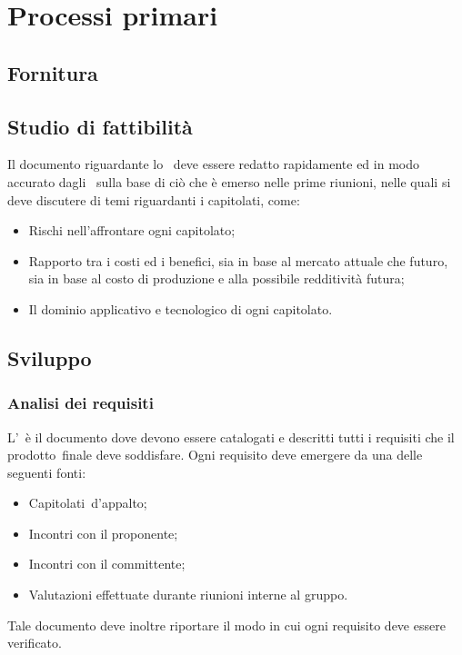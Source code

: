 \documentclass[../NormeProgetto.tex]{subfiles}
\begin{document}
\section{Processi primari}
	\subsection{Fornitura}
		\subsection{Studio di fattibilità}
			Il documento riguardante lo \studiodifattibilita\ deve essere redatto rapidamente ed in modo accurato dagli \analisti\ sulla base di ciò che è emerso nelle prime riunioni, nelle quali si deve discutere di temi riguardanti i capitolati, come:
			\begin{itemize}
				\item Rischi nell'affrontare ogni capitolato\g;
				\item Rapporto tra i costi ed i benefici, sia in base al mercato attuale che futuro, sia in base al costo di produzione e alla possibile redditività futura;
				\item Il dominio applicativo e tecnologico di ogni capitolato\g.
			\end{itemize}
	\subsection{Sviluppo}
		\subsubsection{Analisi dei requisiti}
			L'\analisideirequisiti\ è il documento dove devono essere catalogati e descritti tutti i requisiti che il prodotto\g\ finale deve soddisfare. Ogni requisito deve emergere da una delle seguenti fonti:
			\begin{itemize}
				\item Capitolati\g\ d'appalto;
				\item Incontri con il proponente;
				\item Incontri con il committente;
				\item Valutazioni effettuate durante riunioni interne al gruppo.
			\end{itemize}
			Tale documento deve inoltre riportare il modo in cui ogni requisito deve essere verificato.
\end{document}
